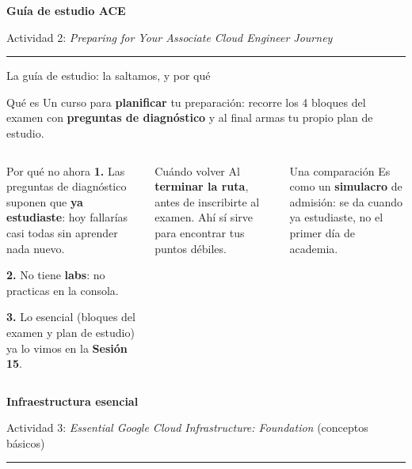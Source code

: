 \documentclass[aspectratio=169,10pt,c]{beamer}
\begin{document}
\begin{frame}[plain]
\vfill
\begin{center}
{\fontsize{29}{34}\selectfont\bfseries Guía de estudio ACE}\par
\vspace{2mm}
{\small Actividad 2: \emph{Preparing for Your Associate Cloud Engineer Journey}}\par
\vspace{4mm}
{\color{utpRojo}\rule{8.5cm}{1.2pt}}
\end{center}
\vfill
\end{frame}

\begin{frame}{La guía de estudio: la saltamos, y por qué}
\begin{block}{Qué es}
\small Un curso para \textbf{planificar} tu preparación: recorre los 4 bloques del examen con \textbf{preguntas de diagnóstico} y al final armas tu propio plan de estudio.
\end{block}
\begin{columns}[T,onlytextwidth]
\begin{alertblock}{Por qué no ahora}
\small
\textbf{1.} Las preguntas de diagnóstico suponen que \textbf{ya estudiaste}: hoy fallarías casi todas sin aprender nada nuevo.\par\smallskip
\textbf{2.} No tiene \textbf{labs}: no practicas en la consola.\par\smallskip
\textbf{3.} Lo esencial (bloques del examen y plan de estudio) ya lo vimos en la \textbf{Sesión 15}.
\end{alertblock}
\begin{exampleblock}{Cuándo volver}
\small Al \textbf{terminar la ruta}, antes de inscribirte al examen. Ahí sí sirve para encontrar tus puntos débiles.
\end{exampleblock}
\begin{block}{Una comparación}
\small Es como un \textbf{simulacro} de admisión: se da cuando ya estudiaste, no el primer día de academia.
\end{block}
\end{columns}
\end{frame}

\begin{frame}[plain]
\vfill
\begin{center}
{\fontsize{29}{34}\selectfont\bfseries Infraestructura esencial}\par
\vspace{2mm}
{\small Actividad 3: \emph{Essential Google Cloud Infrastructure: Foundation} (conceptos básicos)}\par
\vspace{4mm}
{\color{utpRojo}\rule{8.5cm}{1.2pt}}
\end{center}
\vfill
\end{frame}
\end{document}
